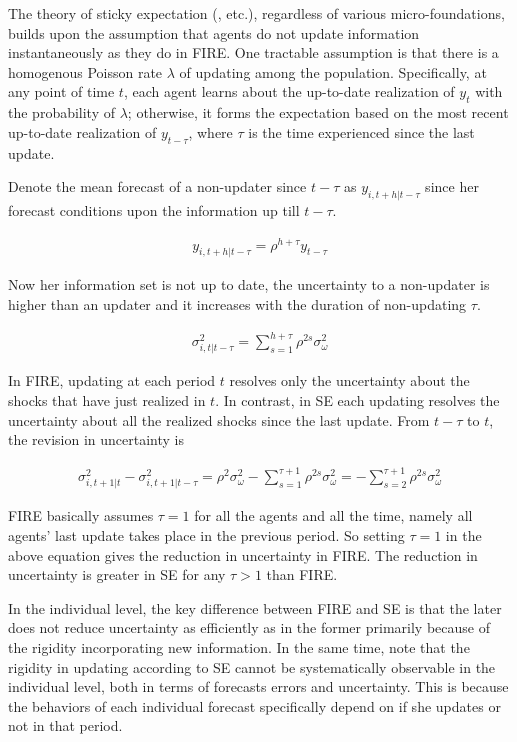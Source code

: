\documentclass[]{article}
\begin{document}
	The theory of sticky expectation (\citet{mankiw2002sticky}, \citet{carroll2003macroeconomic} etc.), regardless of various micro-foundations, builds upon the assumption that agents do not update information instantaneously as they do in FIRE. One tractable assumption is that there is a homogenous Poisson rate $\lambda$ of updating among the population. Specifically, at any point of time $t$, each agent learns about the up-to-date realization of $y_t$ with the probability of $\lambda$; otherwise, it forms the expectation based on the most recent up-to-date realization of $y_{t-\tau}$, where $\tau$ is the time experienced since the last update. 
	
	Denote the mean forecast of a non-updater since $t-\tau$ as $y_{i,t+h|t-\tau}$ since her forecast conditions upon the information up till $t-\tau$. 
	
	\begin{eqnarray} 
		y_{i,t+h|t-\tau} = \rho^{h+\tau} y_{t-\tau}
	\end{eqnarray}
	
	Now her information set is not up to date, the uncertainty to a non-updater is higher than an updater and it increases with the duration of non-updating $\tau$. 
	
	\begin{eqnarray}\label{VarSEInd}
		\sigma^2_{i,t|t-\tau}= \sum^{h+\tau}_{s=1}\rho^{2s} \sigma^2_{\omega}
	\end{eqnarray}	
	
	In FIRE, updating at each period $t$ resolves only the uncertainty about the shocks that have just realized in $t$. In contrast, in SE each updating resolves the uncertainty about all the realized shocks since the last update. From $t-\tau$ to $t$, the revision in uncertainty is 
	
	\begin{eqnarray}
		\sigma^2_{i,t+1|t} - \sigma^2_{i,t+1|t-\tau} = \rho^{2} \sigma^2_{\omega} - \sum^{\tau+1}_{s=1}\rho^{2s} \sigma^2_{\omega} = -\sum^{\tau+1}_{s=2} \rho^{2s}\sigma^2_{\omega}
	\end{eqnarray}
	
	FIRE basically assumes  $\tau=1$ for all the agents and all the time, namely all agents' last update takes place in the previous period. So setting $\tau =1$ in the above equation gives the reduction in uncertainty in FIRE. The reduction in uncertainty is greater in SE for any $\tau>1$ than FIRE.
	
	In the individual level, the key difference between FIRE and SE is that the later does not reduce uncertainty  as efficiently as in the former primarily because of the rigidity incorporating new information. In the same time, note that the rigidity in updating according to SE cannot be systematically observable in the individual level, both in terms of forecasts errors and uncertainty. This is because the behaviors of each individual forecast specifically depend on if she updates or not in that period. 
	
\end{document}
